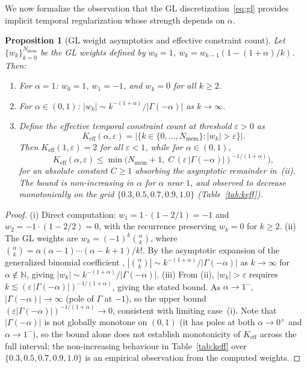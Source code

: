 \documentclass[11pt]{article}
\newtheorem{Proposition}{Proposition}
\begin{document}
We now formalize the observation that the GL discretization~\eqref{eq:gl} provides implicit temporal regularization whose strength depends on $\alpha$.

\begin{Proposition}[GL weight asymptotics and effective constraint count]
\label{prop:keff}
Let $\{w_k\}_{k=0}^{N_{\mathrm{mem}}}$ be the GL weights defined by $w_0 = 1$, $w_k = w_{k-1}(1-(1+\alpha)/k)$. Then:
\begin{enumerate}
\item[(i)] For $\alpha = 1$: $w_0 = 1$, $w_1 = -1$, and $w_k = 0$ for all $k \geq 2$.
\item[(ii)] For $\alpha \in (0,1)$: $|w_k| \sim k^{-(1+\alpha)} / |\Gamma(-\alpha)|$ as $k \to \infty$.
\item[(iii)] Define the effective temporal constraint count at threshold $\varepsilon > 0$ as
\begin{equation}
\label{eq:keff}
K_{\mathrm{eff}}(\alpha, \varepsilon) = \bigl|\{k \in \{0, \ldots, N_{\mathrm{mem}}\} : |w_k| > \varepsilon\}\bigr|.
\end{equation}
Then $K_{\mathrm{eff}}(1, \varepsilon) = 2$ for all $\varepsilon < 1$, while for $\alpha \in (0,1)$,
\begin{equation}
K_{\mathrm{eff}}(\alpha, \varepsilon) \leq \min\bigl(N_{\mathrm{mem}}+1,\; C\,(\varepsilon\,|\Gamma(-\alpha)|)^{-1/(1+\alpha)}\bigr),
\end{equation}
for an absolute constant $C \geq 1$ absorbing the asymptotic remainder in~(ii). The bound is non-increasing in $\alpha$ for $\alpha$ near $1$, and observed to decrease monotonically on the grid $\{0.3, 0.5, 0.7, 0.9, 1.0\}$ (Table~\ref{tab:keff}).
\end{enumerate}
\end{Proposition}

\begin{proof}
(i) Direct computation: $w_1 = 1 \cdot (1 - 2/1) = -1$ and $w_2 = -1 \cdot (1 - 2/2) = 0$, with the recurrence preserving $w_k = 0$ for $k \geq 2$.
(ii) The GL weights are $w_k = (-1)^k \binom{\alpha}{k}$, where $\binom{\alpha}{k} = \alpha(\alpha-1)\cdots(\alpha-k+1)/k!$. By the asymptotic expansion of the generalized binomial coefficient \cite{podlubny1999fractional,li2015numerical}, $|\binom{\alpha}{k}| \sim k^{-(1+\alpha)}/|\Gamma(-\alpha)|$ as $k \to \infty$ for $\alpha \notin \mathbb{N}$, giving $|w_k| \sim k^{-(1+\alpha)}/|\Gamma(-\alpha)|$.
(iii) From (ii), $|w_k| > \varepsilon$ requires $k \lesssim (\varepsilon\,|\Gamma(-\alpha)|)^{-1/(1+\alpha)}$, giving the stated bound. As $\alpha \to 1^-$, $|\Gamma(-\alpha)| \to \infty$ (pole of $\Gamma$ at $-1$), so the upper bound $(\varepsilon|\Gamma(-\alpha)|)^{-1/(1+\alpha)} \to 0$, consistent with limiting case~(i). Note that $|\Gamma(-\alpha)|$ is not globally monotone on $(0,1)$ (it has poles at both $\alpha \to 0^+$ and $\alpha \to 1^-$), so the bound alone does not establish monotonicity of $K_{\mathrm{eff}}$ across the full interval; the non-increasing behaviour in Table~\ref{tab:keff} over $\{0.3,0.5,0.7,0.9,1.0\}$ is an empirical observation from the computed weights.
\end{proof}
\end{document}
